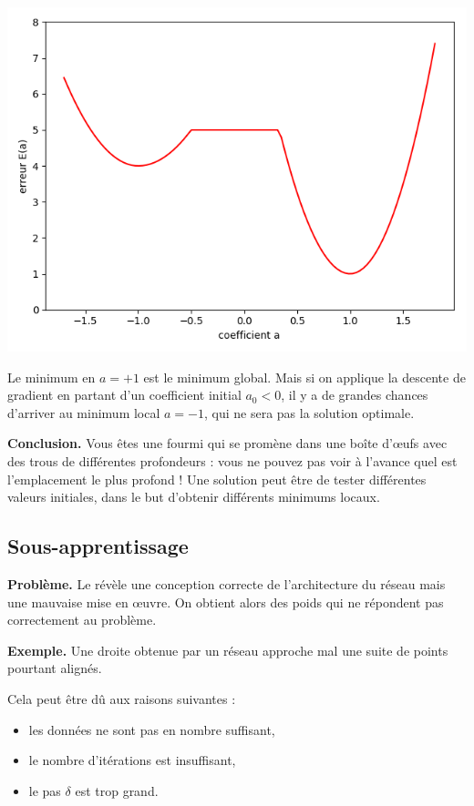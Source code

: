 {\begin{center}
	\includegraphics[scale=\myscale,scale=0.45]{figures/retro_04_e}
\end{center}
Le minimum en $a=+1$ est le minimum global. Mais si on applique la descente de gradient en partant d'un coefficient initial $a_0<0$, il y a de grandes chances d'arriver au minimum local $a=-1$, qui ne sera pas la solution optimale.

\bigskip

\textbf{Conclusion.} Vous êtes une fourmi qui se promène dans une boîte d'\oe ufs avec des trous de différentes profondeurs : vous ne pouvez pas voir à l'avance quel est l'emplacement le plus profond ! Une solution peut être de tester différentes valeurs initiales, dans le but d'obtenir différents minimums locaux.

\subsection{Sous-apprentissage}

\textbf{Problème.}
Le  révèle une conception correcte de l'architecture du réseau mais une mauvaise mise en \oe uvre. On obtient alors des poids qui ne répondent pas correctement au problème.

\bigskip
\textbf{Exemple.} Une droite obtenue par un réseau approche mal une suite de points pourtant alignés.

Cela peut être dû aux raisons suivantes :
\begin{itemize}
	\item les données ne sont pas en nombre suffisant, 
	\item le nombre d'itérations est insuffisant,
	\item le pas $\delta$ est trop grand.
\end{itemize}

}
